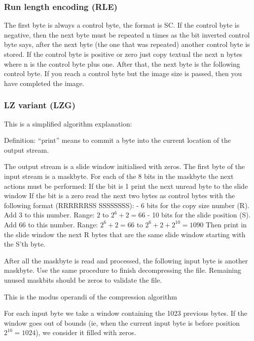 \documentclass{article}
\begin{document}
\subsubsection{Run length encoding (RLE)} %
 The first byte is always a control byte, the format is SC. If the control
 byte is negative, then the next byte must be repeated n times as the bit
 inverted control byte says, after the next byte (the one that was
 repeated)
 another control byte is stored.
 If the control byte is positive or zero just copy textual the next n bytes
 where n is the control byte plus one. After that, the next byte is the
 following control byte.
 If you reach a control byte but the image size is passed, then you have
 completed the image.

\subsubsection{LZ variant (LZG)} %
 This is a simplified algorithm explanation:

 Definition: ``print'' means to commit a byte into the current location
             of the output stream.

 The output stream is a slide window initialised with zeros.
 The first byte of the input stream is a maskbyte.
 For each of the 8 bits in the maskbyte the next actions must be performed:
  If the bit is 1 print the next unread byte to the slide window
  If the bit is a zero read the next two bytes as control bytes with the
  following format (RRRRRRSS SSSSSSSS):
   - 6  bits for the copy size number (R). Add 3 to this number.
        Range: $2$ to $2^6+2=66$
   - 10 bits for the slide position (S). Add 66 to this number.
        Range: $2^6+2=66$ to $2^6+2+2^{10}=1090$
   Then print in the slide window the next R bytes that are the same slide
   window starting with the S'th byte.

 After all the maskbyte is read and processed, the following input byte is
 another maskbyte. Use the same procedure to finish decompressing the file.
 Remaining unused maskbits should be zeros to validate the file.

 This is the modus operandi of the compression algorithm

 For each input byte we take a window containing the 1023 previous bytes.
 If the window goes out of bounds (ie, when the current input byte is
 before position $2^{10}=1024$), we consider it filled with zeros.
\end{document}
